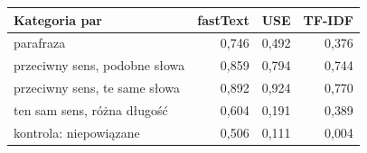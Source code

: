 \begin{tabular}{lrrr}
\toprule
Kategoria par & fastText & USE & TF-IDF \\
\midrule
parafraza & 0{,}746 & 0{,}492 & 0{,}376 \\
przeciwny sens, podobne słowa & 0{,}859 & 0{,}794 & 0{,}744 \\
przeciwny sens, te same słowa & 0{,}892 & 0{,}924 & 0{,}770 \\
ten sam sens, różna długość & 0{,}604 & 0{,}191 & 0{,}389 \\
kontrola: niepowiązane & 0{,}506 & 0{,}111 & 0{,}004 \\
\bottomrule
\end{tabular}
